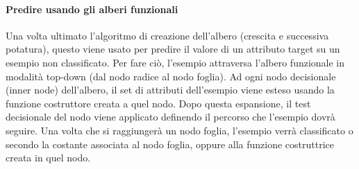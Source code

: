 \paragraph{Predire usando gli alberi funzionali}
Una volta ultimato l'algoritmo di creazione dell'albero (crescita e successiva potatura), questo viene usato per predire il valore di un attributo target su un esempio non classificato. Per fare ciò, l'esempio attraversa l'albero funzionale in modalità top-down (dal nodo radice al nodo foglia). Ad ogni nodo decisionale (inner node) dell'albero, il set di attributi dell'esempio viene esteso usando la funzione costruttore creata a quel nodo. Dopo questa espansione, il test decisionale del nodo viene applicato definendo il percorso che l'esempio dovrà seguire. Una volta che si raggiungerà un nodo foglia, l'esempio verrà classificato o secondo la costante associata al nodo foglia, oppure alla funzione costruttrice creata in quel nodo.

